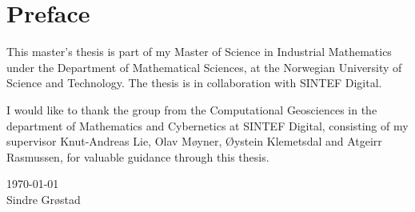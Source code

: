 {}
\chapter*{Preface}
This master's thesis is part of my Master of Science in Industrial Mathematics under the Department of Mathematical Sciences, at the Norwegian University of Science and Technology. The thesis is in collaboration with SINTEF Digital. 

I would like to thank the group from the Computational Geosciences in the department of Mathematics and Cybernetics at SINTEF Digital, consisting of my supervisor Knut-Andreas Lie, Olav Møyner, Øystein Klemetsdal and Atgeirr Rasmussen, for valuable guidance through this thesis.

\today \\
Sindre Grøstad